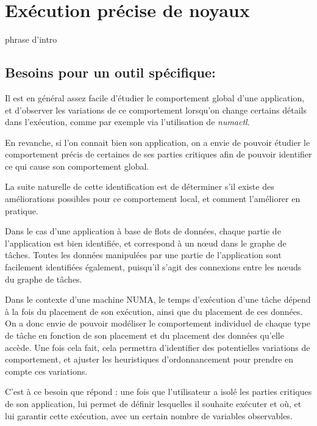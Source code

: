 \section{Exécution précise de noyaux}\label{sec:contribs:outil}

\begin{todo}
  phrase d'intro
\end{todo}

\subsection{Besoins pour un outil spécifique: \outil}

Il est en général assez facile d'étudier le comportement global d'une application, et d'observer les variations de ce comportement lorsqu'on change certains détails dans l'exécution, comme par exemple via l'utilisation de \emph{numactl}.

En revanche, si l'on connait bien son application, on a envie de pouvoir étudier le comportement précis de certaines de ses parties critiques afin de pouvoir identifier ce qui cause son comportement global.

La suite naturelle de cette identification est de déterminer s'il existe des améliorations possibles pour ce comportement local, et comment l'améliorer en pratique.

Dans le cas d'une application à base de flots de données, chaque partie de l'application est bien identifiée, et correspond à un nœud dans le graphe de tâches.
Toutes les données manipulées par une partie de l'application sont facilement identifiées également, puisqu'il s'agit des connexions entre les nœuds du graphe de tâches.

Dans le contexte d'une machine NUMA, le temps d'exécution d'une tâche dépend à la fois du placement de son exécution, ainsi que du placement de ces données. On a donc envie de pouvoir modéliser le comportement individuel de chaque type de tâche en fonction de son placement et du placement des données qu'elle accède.
Une fois cela fait, cela permettra d'identifier des potentielles variations de comportement, et ajuster les heuristiques d'ordonnancement pour prendre en compte ces variations.

C'est à ce besoin que répond \outil : une fois que l'utilisateur a isolé les parties critiques de son application, \outil lui permet de définir lesquelles il souhaite exécuter et où, et lui garantir cette exécution, avec un certain nombre de variables observables.

